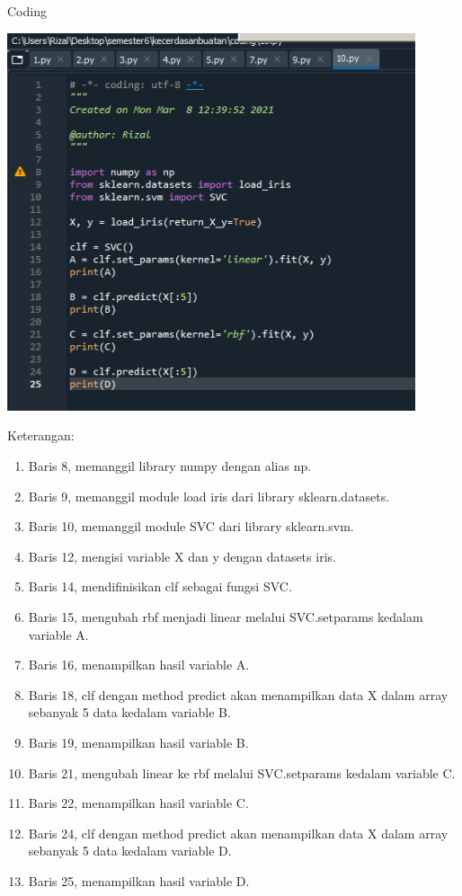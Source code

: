 \documentclass{article}
\begin{document}
Coding
    \begin{center}
    \includegraphics[width=12cm]{figures/1184033/chapter1/23.PNG}
    \end{center}

Keterangan:
    \begin{enumerate}
\item Baris 8, memanggil library numpy dengan alias np.
\item Baris 9, memanggil module load iris dari library sklearn.datasets.
\item Baris 10, memanggil module SVC dari library sklearn.svm.
\item Baris 12, mengisi variable X dan y dengan datasets iris.
\item Baris 14, mendifinisikan clf sebagai fungsi SVC.
\item Baris 15, mengubah rbf menjadi linear melalui SVC.setparams kedalam variable A.
\item Baris 16, menampilkan hasil variable A.
\item Baris 18, clf dengan method predict akan menampilkan data X dalam array sebanyak 5 data kedalam variable B.
\item Baris 19, menampilkan hasil variable B.
\item Baris 21, mengubah linear ke rbf melalui SVC.setparams kedalam variable C.
\item Baris 22, menampilkan hasil variable C.
\item Baris 24, clf dengan method predict akan menampilkan data X dalam array sebanyak 5 data kedalam variable D.
\item Baris 25, menampilkan hasil variable D.
\end{enumerate}
\end{document}
